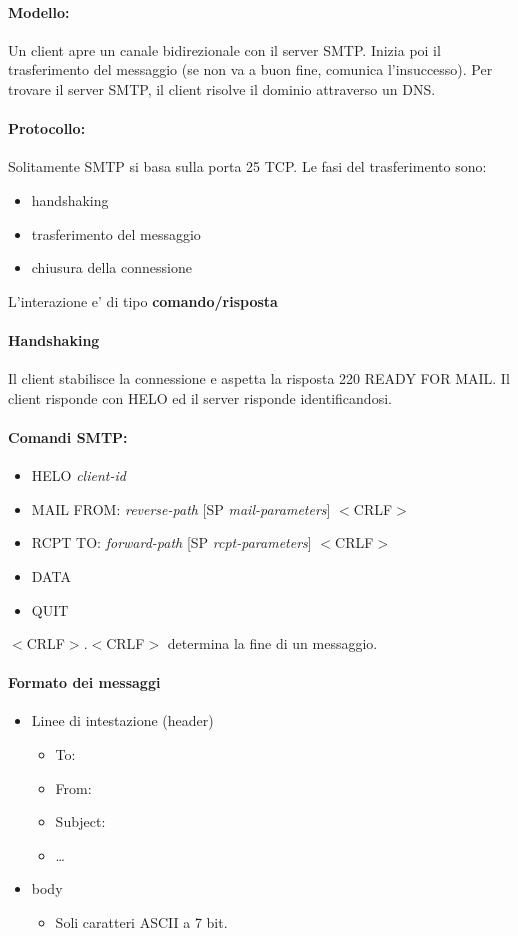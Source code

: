 \paragraph{Modello: }
Un client apre un canale bidirezionale con il server SMTP. Inizia poi il trasferimento del messaggio (se non va a buon fine, comunica l'insuccesso).
Per trovare il server SMTP, il client risolve il dominio attraverso un DNS.

\paragraph{Protocollo: }
Solitamente SMTP si basa sulla porta 25 TCP.
Le fasi del trasferimento sono:
\begin{itemize}
    \item handshaking
    \item trasferimento del messaggio
    \item chiusura della connessione
\end{itemize}
L'interazione e' di tipo \textbf{comando/risposta}

\paragraph{Handshaking} Il client stabilisce la connessione e aspetta la risposta 220 READY FOR MAIL. Il client risponde con HELO ed il server risponde identificandosi.
\paragraph{Comandi SMTP:}
\begin{itemize}
    \item HELO \textit{client-id}
    \item MAIL FROM: \textit{reverse-path} [SP \textit{mail-parameters}] $<$CRLF$>$
    \item RCPT TO: \textit{forward-path} [SP \textit{rcpt-parameters}] $<$CRLF$>$
    \item DATA
    \item QUIT
\end{itemize}
$<$CRLF$>$.$<$CRLF$>$ determina la fine di un messaggio.

\newpage
\paragraph{Formato dei messaggi}
\begin{itemize}
    \item Linee di intestazione (header)
    \begin{itemize}
        \item To:
        \item From:
        \item Subject:
        \item \dots
    \end{itemize}
    \item body
    \begin{itemize}
        \item Soli caratteri ASCII a 7 bit.
    \end{itemize}
\end{itemize}

